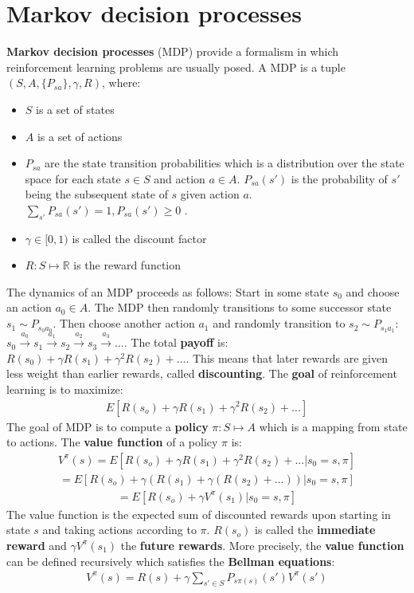\documentclass{report}
\begin{document}
\section{Markov decision processes}
{\bf Markov decision processes} (MDP) provide a formalism in which reinforcement learning problems are usually posed. A MDP is a tuple $(S,A,\{P_{sa}\},\gamma, R)$, where:
\begin{itemize}
\item $S$ is a set of states
\item $A$ is a set of actions
\item $P_{sa}$ are the state transition probabilities which is a distribution over the state space for each state $s\in S$ and action $a\in A$. $P_{sa}(s')$ is the probability of $s'$ being the subsequent state of $s$ given action $a$. $\sum_{s'}P_{sa}(s')=1, P_{sa}(s')\ge 0$ .
\item $\gamma \in [0,1)$ is called the discount factor
\item $R:S \mapsto \mathbb{R}$ is the reward function
\end{itemize}

The dynamics of an MDP proceeds as follows: Start in some state $s_0$ and choose an action $a_0\in A$. The MDP then randomly transitions to some successor state $s_1\sim P_{s_0a_0}$. Then choose another action $a_1$ and randomly transition to $s_2\sim P_{s_1a_1}$: $s_0\xrightarrow{a_0}s_1\xrightarrow{a_1}s_2\xrightarrow{a_2}s_3\xrightarrow{a_3}...$. The total {\bf payoff} is: $R(s_0)+\gamma R(s_1)+\gamma^2R(s_2)+...$. This means that later rewards are given less weight than earlier rewards, called {\bf discounting}. The {\bf goal} of reinforcement learning is to maximize:
\begin{align*}
E[R(s_o)+\gamma R(s_1)+\gamma^2 R(s_2)+...]
\end{align*}
The goal of MDP is to compute a {\bf policy} $\pi:S\mapsto A$ which is a mapping from state to actions. The {\bf value function} of a policy $\pi$ is:
\begin{align*}
V^{\pi}(s) = E[R(s_o)+\gamma R(s_1)+\gamma^2 R(s_2)+...\vert s_0=s,\pi]
\end{align*}
\begin{align*}
= E[R(s_o)+\gamma (R(s_1)+\gamma (R(s_2)+...))\vert s_0=s,\pi]
\end{align*}
\begin{align*}
= E[R(s_o)+\gamma V^{\pi}(s_1)\vert s_0=s,\pi]
\end{align*}
The value function is the expected sum of discounted rewards upon starting in state $s$ and taking actions according to $\pi$.
$R(s_o)$ is called the {\bf immediate reward} and $\gamma V^{\pi}(s_1)$ the {\bf future rewards}.
More precisely, the {\bf value function} can be defined recursively which satisfies the {\bf Bellman equations}:
\begin{align*}
V^{\pi}(s) = R(s)+\gamma \sum_{s'\in S} P_{s\pi(s)}(s')V^{\pi}(s')
\end{align*}
\end{document}
